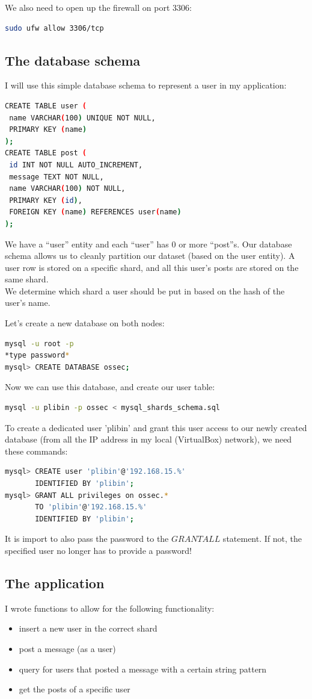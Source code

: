 \documentclass[12pt]{report}
\begin{document}
We also need to open up the firewall on port 3306:
\begin{lstlisting}[language=bash]
sudo ufw allow 3306/tcp
\end{lstlisting}

\subsection{The database schema}
I will use this simple database schema to represent a user in my
application:
\begin{lstlisting}[language=bash]
CREATE TABLE user (
 name VARCHAR(100) UNIQUE NOT NULL, 
 PRIMARY KEY (name)
);
CREATE TABLE post (
 id INT NOT NULL AUTO_INCREMENT,
 message TEXT NOT NULL,
 name VARCHAR(100) NOT NULL,
 PRIMARY KEY (id),
 FOREIGN KEY (name) REFERENCES user(name)
);
\end{lstlisting}
We have a ``user'' entity and each ``user'' has 0 or more ``post''s. Our
database schema allows us to cleanly partition our dataset (based on
the user entity). A user row is stored on a specific shard, and all
this user's posts are stored on the same shard.\\
We determine which shard a user should be put in based on the hash of
the user's name.

Let's create a new database on both nodes:
\begin{lstlisting}[language=bash]
mysql -u root -p
*type password*
mysql> CREATE DATABASE ossec;
\end{lstlisting}
Now we can use this database, and create our user table:
\begin{lstlisting}[language=bash]
mysql -u plibin -p ossec < mysql_shards_schema.sql
\end{lstlisting}
To create a dedicated user 'plibin' and grant this user access to our
newly created database (from all the IP address in my local
(VirtualBox) network), we need these commands:
\begin{lstlisting}[language=bash]
mysql> CREATE user 'plibin'@'192.168.15.%' 
       IDENTIFIED BY 'plibin';
mysql> GRANT ALL privileges on ossec.* 
       TO 'plibin'@'192.168.15.%' 
       IDENTIFIED BY 'plibin';
\end{lstlisting}

It is import to also pass the password to the $GRANT ALL$
statement. If not, the specified user no longer has to provide a
password!

\subsection{The application}
I wrote functions to allow for the following functionality:
\begin{itemize}
\item insert a new user in the correct shard
\item post a message (as a user)
\item query for users that posted a message with a certain string
  pattern
\item get the posts of a specific user
\end{itemize}
\end{document}
